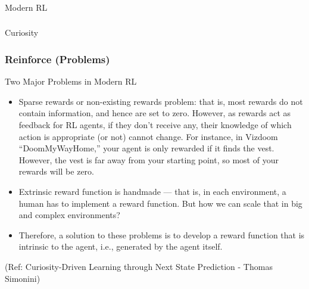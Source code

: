 \begin{frame}[fragile]\frametitle{}
\begin{center}
{\Large Modern RL}
\end{center}
\end{frame}

\begin{frame}[fragile]\frametitle{}
\begin{center}
{\Large Curiosity}
\end{center}
\end{frame}

\begin{frame}[fragile]\frametitle{Reinforce (Problems)}

Two Major Problems in Modern RL

\begin{itemize}
\item Sparse rewards or non-existing rewards problem: that is, most rewards do not contain information, and hence are set to zero. However, as rewards act as feedback for RL agents, if they don’t receive any, their knowledge of which action is appropriate (or not) cannot change. For instance, in Vizdoom “DoomMyWayHome,” your agent is only rewarded if it finds the vest. However, the vest is far away from your starting point, so most of your rewards will be zero.
\item Extrinsic reward function is handmade — that is, in each environment, a human has to implement a reward function. But how we can scale that in big and complex environments?
\item Therefore, a solution to these problems is to develop a reward function that is intrinsic to the agent, i.e., generated by the agent itself. 
\end{itemize}

{\tiny (Ref: Curiosity-Driven Learning through Next State Prediction - Thomas Simonini)}

\end{frame}

